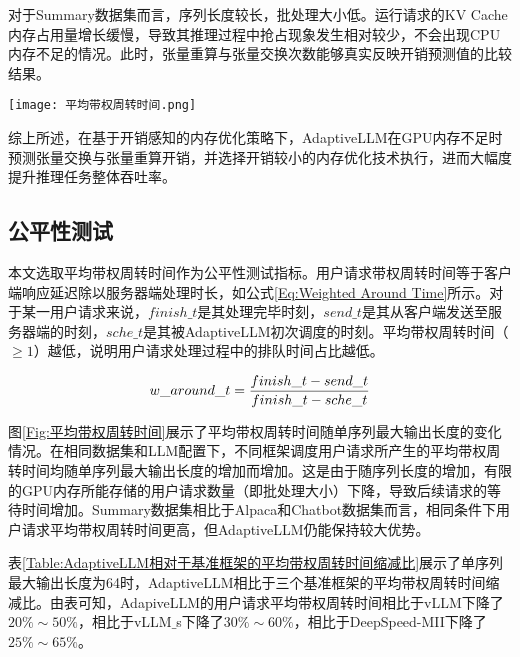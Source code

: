 对于Summary数据集而言，序列长度较长，批处理大小低。运行请求的KV Cache内存占用量增长缓慢，导致其推理过程中抢占现象发生相对较少，不会出现CPU内存不足的情况。此时，张量重算与张量交换次数能够真实反映开销预测值的比较结果。

\begin{figure*}[!htbp]
  \centering
  \texttt{[image: 平均带权周转时间.png]}
  \caption{用户请求平均带权周转时间}
  \label{Fig:平均带权周转时间}
\end{figure*}

综上所述，在基于开销感知的内存优化策略下，AdaptiveLLM在GPU内存不足时预测张量交换与张量重算开销，并选择开销较小的内存优化技术执行，进而大幅度提升推理任务整体吞吐率。 

\subsection{公平性测试}

本文选取平均带权周转时间作为公平性测试指标。用户请求带权周转时间等于客户端响应延迟除以服务器端处理时长，如公式\ref{Eq:Weighted Around Time}所示。对于某一用户请求来说，$finish\_t$是其处理完毕时刻，$send\_t$是其从客户端发送至服务器端的时刻，$sche\_t$是其被AdaptiveLLM初次调度的时刻。平均带权周转时间（$\geq 1$）越低，说明用户请求处理过程中的排队时间占比越低。 

\begin{equation}
  \begin{aligned}
    w\_around\_t = \frac{finish\_t - send\_t}{finish\_t - sche\_t}
  \end{aligned}
  \label{Eq:Weighted Around Time}
  \setlength{\abovedisplayskip}{0ex}
  \setlength{\belowdisplayskip}{2ex}
\end{equation}

图\ref{Fig:平均带权周转时间}展示了平均带权周转时间随单序列最大输出长度的变化情况。在相同数据集和LLM配置下，不同框架调度用户请求所产生的平均带权周转时间均随单序列最大输出长度的增加而增加。这是由于随序列长度的增加，有限的GPU内存所能存储的用户请求数量（即批处理大小）下降，导致后续请求的等待时间增加。Summary数据集相比于Alpaca和Chatbot数据集而言，相同条件下用户请求平均带权周转时间更高，但AdaptiveLLM仍能保持较大优势。

表\ref{Table:AdaptiveLLM相对于基准框架的平均带权周转时间缩减比}展示了单序列最大输出长度为64时，AdaptiveLLM相比于三个基准框架的平均带权周转时间缩减比。由表可知，AdapiveLLM的用户请求平均带权周转时间相比于vLLM下降了$20\%\sim50\%$，相比于vLLM$\_$s下降了$30\%\sim60\%$，相比于DeepSpeed-MII下降了$25\%\sim65\%$。

